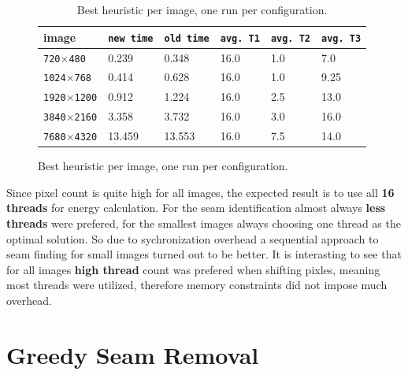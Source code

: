 \documentclass[11pt]{article}
\begin{document}
\begin{figure}[H]
    \begin{minipage}{\textwidth}
        \begin{table}[H]
            \centering
            \begin{tabular}{|l|p{2.1cm}|p{2.2cm}|p{1.7cm}|p{1.7cm}|p{1.7cm}|} \hline
                \cellcolor{blue!20}\textbf{image} &\cellcolor{blue!20}\texttt{new time} & \cellcolor{blue!20}\texttt{old time} & \cellcolor{blue!20}\texttt{avg. T1} & \cellcolor{blue!20}\texttt{avg. T2} & \cellcolor{blue!20}\texttt{avg. T3} \\ \hline
                \texttt{720$\times$480} & \cellcolor{green!20}0.239 & \cellcolor{red!20}0.348 & 16.0 & 1.0 & 7.0 \\ \hline
                \texttt{1024$\times$768} & \cellcolor{green!20}0.414 & \cellcolor{red!20}0.628 & 16.0 & 1.0 & 9.25 \\ \hline
                \texttt{1920$\times$1200} & \cellcolor{green!20}0.912 & \cellcolor{red!20}1.224 & 16.0 & 2.5 & 13.0 \\ \hline
                \texttt{3840$\times$2160} & \cellcolor{green!20}3.358 & \cellcolor{red!20}3.732 & 16.0 & 3.0 & 16.0 \\ \hline
                \texttt{7680$\times$4320} & \cellcolor{green!20}13.459 & \cellcolor{red!20}13.553 & 16.0 & 7.5 & 14.0 \\ \hline
            \end{tabular}
            \caption{Best heuristic per image, one run per configuration.}
        \end{table}
    \end{minipage}
\end{figure}

Since pixel count is quite high for all images, the expected result is to use all \textbf{16 threads} for energy calculation. For the seam identification almost always \textbf{less threads} were prefered, for the smallest images always choosing one thread as the optimal solution. So due to sychronization overhead a sequential approach to seam finding for small images turned out to be better. It is interasting to see that for all images \textbf{high thread} count was prefered when shifting pixles, meaning most threads were utilized, therefore memory constraints did not impose much overhead.

\section{Greedy Seam Removal}
\end{document}
